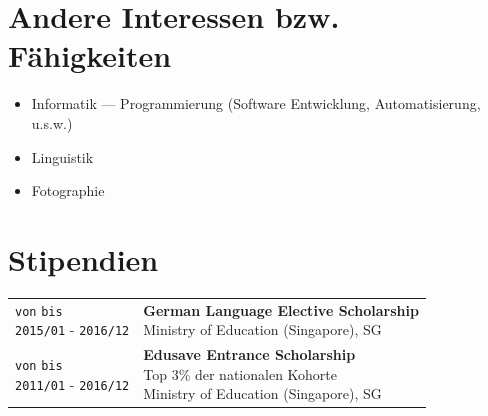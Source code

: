 \documentclass[11pt]{article}
\newcommand{\job}[1]{\textbf{#1}}
\begin{document}
\section{\textcolor{section_5}{Andere Interessen bzw. Fähigkeiten}}
	\begin{itemize}
		\item Informatik --- Programmierung {\small (Software Entwicklung, Automatisierung, u.s.w.)}
		\item Linguistik
		\item Fotographie
	\end{itemize}

\section{\textcolor{section_1}{Stipendien}}
	\begin{center}
		\renewcommand{\arraystretch}{1.3}
		\renewcommand{\cellalign}{lt}
		\begin{tabularx}{0.9\textwidth}{  p{4cm}  X  }
			\makecell{\texttt{\footnotesize von} \hspace{2.4em} \texttt{\footnotesize bis} \\ \texttt{2015{\footnotesize /01}} - \texttt{2016{\footnotesize /12}}} & \makecell{\job{German Language Elective Scholarship}\\ {\small Ministry of Education (Singapore), SG}} \\
			\makecell{\texttt{\footnotesize von} \hspace{2.4em} \texttt{\footnotesize bis} \\ \texttt{2011{\footnotesize /01}} - \texttt{2016{\footnotesize /12}}} & \makecell{\job{Edusave Entrance Scholarship} \\ {\small Top 3\% der nationalen Kohorte} \\ {\small Ministry of Education (Singapore), SG}} \vspace{0.3em} %
		\end{tabularx}
	\end{center}
\end{document}
